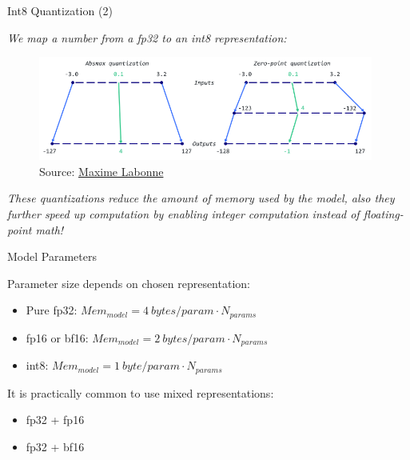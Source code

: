 
\begin{vbframe}{Int8 Quantization (2)}

\textit{We map a number from a fp32 to an int8 representation:}

\vfill

\begin{figure}
	\centering
	\includegraphics[width = 11cm]{./figure/intquant.png} \\ 
	{\footnotesize Source: \href{https://mlabonne.github.io/blog/posts/Introduction_to_Weight_Quantization.html}{Maxime Labonne}}
\end{figure}

\vfill

\textit{These quantizations reduce the amount of memory used by the model, also they further speed up computation by enabling integer computation instead of floating-point math!} 
    
\end{vbframe}


\begin{vbframe}{Model Parameters}

\vfill

Parameter size depends on chosen representation: \newline

\begin{itemize}
 	\item Pure fp32: $Mem_{model} = 4 ~bytes/param \cdot N_{params}$
 	\item fp16 or bf16: $Mem_{model} = 2 ~bytes/param \cdot N_{params}$
	\item int8: $Mem_{model} = 1 ~byte/param \cdot N_{params}$
\end{itemize}

\vskip8mm

It is practically common to use mixed representations: \newline

\begin{itemize}
 	\item fp32 + fp16
	\item fp32 + bf16
\end{itemize}

\vfill

\end{vbframe}


